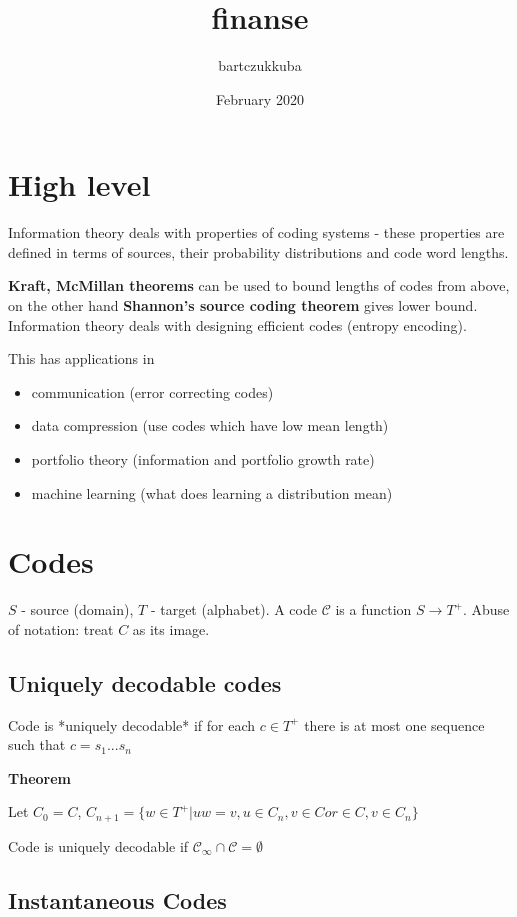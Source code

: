 \documentclass{article}
\title{finanse}
\author{bartczukkuba }
\date{February 2020}
\begin{document}
\section{High level}

Information theory deals with properties of coding systems - these properties are defined in terms of sources,  their probability distributions and code word lengths.

\textbf{Kraft, McMillan theorems} can be used to bound lengths of codes from above, on the other hand \textbf{Shannon's source coding theorem} gives lower bound. Information theory deals with designing efficient codes (entropy encoding).

This has applications in 
\begin{itemize}
	\item communication (error correcting codes)
	\item data compression (use codes which have low mean length)
	\item portfolio theory (information and portfolio growth rate)
	\item machine learning (what does learning a distribution mean)
\end{itemize}


\section{Codes}

$S$ - source (domain), $T$ - target (alphabet). A code $\mathcal{C}$ is a function $S \to T^+$. Abuse of notation: treat $C$ as its image.

\subsection{Uniquely decodable codes}

Code is *uniquely decodable* if for each $c \in T^+$ there is at most one sequence such that $c = s_1...s_n$

\textbf{Theorem}

Let $C_0 = C$, $C_{n+1} = \{w \in T^+ | uw = v, u \in C_n, v \in C or \in C, v \in C_n \}$

Code is uniquely decodable if $\mathcal{C}_\infty \cap \mathcal{C} = \emptyset$

\subsection{Instantaneous Codes}
\end{document}
